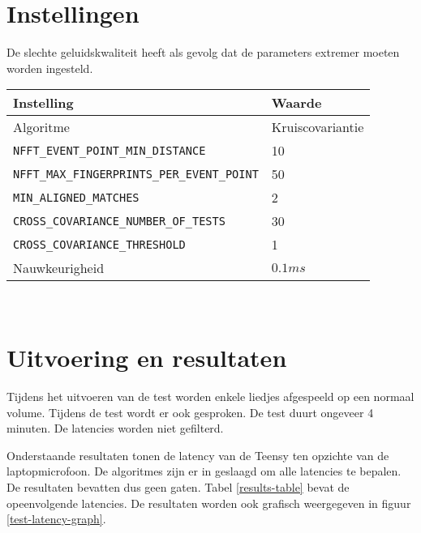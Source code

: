 \section*{Instellingen}

De slechte geluidskwaliteit heeft als gevolg dat de parameters extremer moeten worden ingesteld.\\

\begin{tabular}{ l  l}
	\hline
	\textbf{Instelling} & \textbf{Waarde} \\
	\hline
	Algoritme & Kruiscovariantie \\
	\texttt{NFFT\_EVENT\_POINT\_MIN\_DISTANCE} & 10 \\
	\texttt{NFFT\_MAX\_FINGERPRINTS\_PER\_EVENT\_POINT} & 50 \\
	\texttt{MIN\_ALIGNED\_MATCHES} & 2 \\
	\texttt{CROSS\_COVARIANCE\_NUMBER\_OF\_TESTS} & 30 \\
	\texttt{CROSS\_COVARIANCE\_THRESHOLD} & 1 \\
	Nauwkeurigheid & $0.1ms$ \\
\end{tabular}\\

\section*{Uitvoering en resultaten}

Tijdens het uitvoeren van de test worden enkele liedjes afgespeeld op een normaal volume. Tijdens de test wordt er ook gesproken. De test duurt ongeveer 4 minuten. De latencies worden niet gefilterd.

Onderstaande resultaten tonen de latency van de Teensy ten opzichte van de laptopmicrofoon. De algoritmes zijn er in geslaagd om alle latencies te bepalen. De resultaten bevatten dus geen gaten. Tabel \ref{results-table} bevat de opeenvolgende latencies. De resultaten worden ook grafisch weergegeven in figuur \ref{test-latency-graph}.

